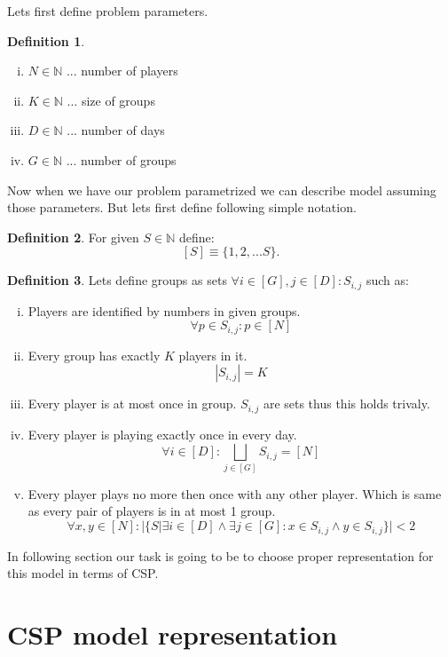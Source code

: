 \documentclass[a4paper]{article}
\theoremstyle{definition}
\newtheorem{definition}{Definition}[section]
\theoremstyle{remark}
\newcommand{\mdef}[2]{
	\theoremstyle{definition}
	\begin{definition}{#1}
	#2
	\end{definition}
}
\begin{document}
Lets first define problem parameters.

\mdef{}{ 
	\begin{enumerate}[(i)]
		\item $ N \in \mathbb{N} $ ... number of players 
		\item $ K \in \mathbb{N} $ ... size of groups
		\item $ D \in \mathbb{N} $ ... number of days
		\item $ G \in \mathbb{N} $ ... number of groups
	\end{enumerate}
}

Now when we have our problem parametrized we can describe model assuming those parameters.
But lets first define following simple notation.
\mdef{}{
	For given $S \in \mathbb{N}$ define:
	$$ [S] \equiv \{1,2,...S\}.  $$
 }

\mdef{}{ Lets define groups as sets $\forall i \in [G], j \in [D]: S_{i,j}$ such  as:
	\begin{enumerate}[(i)]
		\item Players are identified by numbers in given groups. $$\forall p \in S_{i,j}: p \in [N]$$ 
		\item Every group has exactly $K$ players in it. $$ |S_{i,j}| = K$$  
		\item Every player is at most once in group. $S_{i,j}$ are sets thus this holds trivaly. 
		\item Every player is playing exactly once in every day.  $$ \forall i \in [D]: \bigsqcup_{ j \in [G]} S_{i,j} = [N] $$
		\item Every player plays no more then once with any other player. Which is same as every pair of players 
		is in at most 1 group.  $$ \forall x,y \in [N]: |\{S | \exists i \in [D] \land \exists j \in [G]: x \in S_{i,j} \land y \in S_{i,j}\}| < 2 $$
	\end{enumerate}  
}

In following section our task is going to be to choose proper representation for this model in terms of CSP.



\section{CSP model representation}
% 
% 
% 
% 
\end{document}
